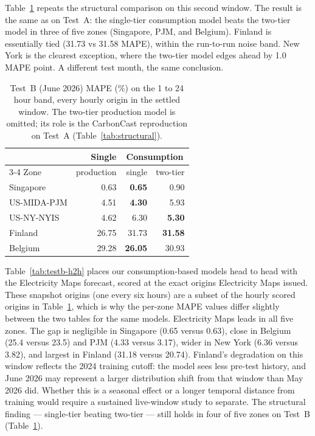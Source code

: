 \documentclass[sigconf,nonacm,a4paper]{acmart}  %
\begin{document}
Table~\ref{tab:testb-struct} repeats the structural comparison on this second
window. The result is the same as on Test~A: the single-tier consumption model
beats the two-tier model in three of five zones (Singapore, PJM, and Belgium).
Finland is essentially tied (31.73 vs 31.58 MAPE), within the run-to-run noise band.
New York is the clearest exception, where the two-tier model edges ahead by 1.0 MAPE point.
A different test month, the same conclusion.

\begin{table}[H]
    \caption{Test~B (June 2026) MAPE (\%) on the 1 to 24 hour band, every hourly
    origin in the settled window. The two-tier production model is omitted; its role is the CarbonCast reproduction
    on Test~A (Table~\ref{tab:structural}).}
    \label{tab:testb-struct}
    \begin{tabular}{lrrr}
    \toprule
     & Single & \multicolumn{2}{c}{Consumption} \\
    \cmidrule(lr){3-4}
    Zone & production & single & two-tier \\
    \midrule
    Singapore   & 0.63  & \textbf{0.65}  & 0.90 \\
    US-MIDA-PJM & 4.51  & \textbf{4.30}  & 5.93 \\
    US-NY-NYIS  & 4.62  & 6.30  & \textbf{5.30} \\
    Finland     & 26.75 & 31.73 & \textbf{31.58} \\
    Belgium     & 29.28 & \textbf{26.05} & 30.93 \\
    \bottomrule
    \end{tabular}
\end{table}
\vspace{1em}


Table~\ref{tab:testb-h2h} places our consumption-based models head to head with the
Electricity Maps forecast, scored at the exact origins Electricity Maps issued. These snapshot origins (one every six hours) are a subset of the hourly scored origins in Table~\ref{tab:testb-struct}, which is why the per-zone MAPE values differ slightly between the two tables for the same models. Electricity Maps leads in all five zones. The gap is negligible in Singapore
(0.65 versus 0.63), close in Belgium (25.4 versus 23.5) and PJM (4.33 versus
3.17), wider in New York (6.36 versus 3.82), and largest in Finland (31.18 versus
20.74). Finland's degradation on this window reflects the 2024 training cutoff: the
model sees less pre-test history, and June 2026 may represent a larger distribution
shift from that window than May 2026 did. Whether this is a seasonal effect or a
longer temporal distance from training would require a sustained live-window study
to separate. The structural finding --- single-tier beating two-tier --- still holds in
four of five zones on Test~B (Table~\ref{tab:testb-struct}).
\end{document}
